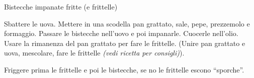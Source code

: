 \begin{recipe}{Bistecche impanate fritte (e frittelle)}
    \begin{header}
        
    \end{header}
    
    \begin{ingredients}
    \end{ingredients}
    
    \begin{preparation}
        \step Sbattere le uova.
        \step Mettere in una scodella pan grattato, sale, pepe, prezzemolo e formaggio.
        \step Passare le bistecche nell'uovo e poi impanarle.
        \step Cuocerle nell'olio.
        \step Usare la rimanenza del pan grattato per fare le frittelle.
            (Unire pan grattato e uova, mescolare, fare le frittelle \textit{(vedi ricetta per consigli)}).
    \end{preparation}
    
    \begin{suggestion}
        \suggestionMark Friggere prima le frittelle e poi le bistecche, se no le frittelle escono ``sporche''.
    \end{suggestion}
\end{recipe}
